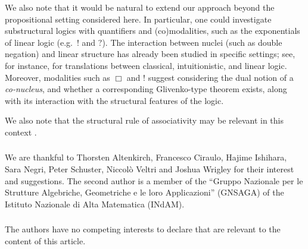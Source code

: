 \documentclass[runningheads]{llncs}
\begin{document}
We also note that it would be natural to extend our approach beyond the propositional setting considered here. In particular, one could investigate substructural logics with quantifiers and (co)modalities, such as the exponentials of linear logic (e.g.\ $!$ and $?$). The interaction between nuclei (such as double negation) and linear structure has already been studied in specific settings; see, for instance, \cite{FerreiraOlivaProtin} for translations between classical, intuitionistic, and linear logic.
Moreover, modalities such as $\Box$ and $!$ suggest considering the dual notion of a \emph{co-nucleus}, and whether a corresponding Glivenko-type theorem exists, along with its interaction with the structural features of the logic.

We also note that the structural rule of associativity may be relevant in this context \cite{Wan_2024}.

\begin{credits}
\subsubsection{\ackname} We are thankful to Thorsten Altenkirch, Francesco Ciraulo, Hajime Ishihara, Sara Negri, Peter Schuster, Niccolò Veltri and Joshua Wrigley for their interest and suggestions.
The second author is a member of the ``Gruppo Nazionale per le Strutture Algebriche, Geometriche e le loro Applicazioni''  (GNSAGA) of the Istituto Nazionale di Alta Matematica (INdAM).

\subsubsection{\discintname}
The authors have no competing interests to declare that are relevant to the content of this article.
\end{credits}
%
%
%


\end{document}

